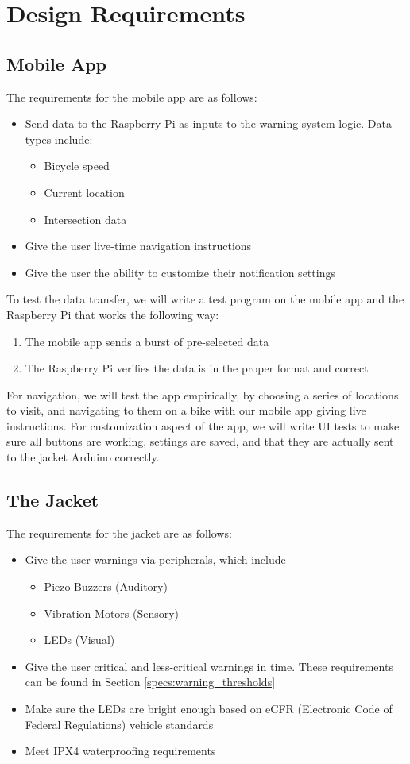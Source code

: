 \documentclass[journal]{IEEEtran}
\begin{document}
\section{Design Requirements}
\subsection{Mobile App}
The requirements for the mobile app are as follows:
\begin{itemize}
  \item Send data to the Raspberry Pi as inputs to the warning system logic. Data types include:
  \begin{itemize}
    \item Bicycle speed
    \item Current location
    \item Intersection data
  \end{itemize}
  \item Give the user live-time navigation instructions
  \item Give the user the ability to customize their notification settings
\end{itemize}
To test the data transfer, we will write a test program on the mobile app and the Raspberry Pi that works the following way:
\begin{enumerate}
    \item The mobile app sends a burst of pre-selected data
    \item The Raspberry Pi verifies the data is in the proper format and correct
\end{enumerate}
For navigation, we will test the app empirically, by choosing a series of locations to visit, and navigating to them on a bike with our mobile app giving live instructions.
For customization aspect of the app, we will write UI tests to make sure all buttons are working, settings are saved, and that they are actually sent to the jacket Arduino correctly. 
\subsection{The Jacket}
The requirements for the jacket are as follows:
\begin{itemize}
  \item Give the user warnings via peripherals, which include
  \begin{itemize}
    \item Piezo Buzzers (Auditory)
    \item Vibration Motors (Sensory)
    \item LEDs (Visual)
  \end{itemize}
  \item Give the user critical and less-critical warnings in time. These requirements can be found in Section \ref{specs:warning_thresholds}
  \item Make sure the LEDs are bright enough based on eCFR (Electronic Code of Federal Regulations) vehicle standards  \item Meet IPX4 waterproofing requirements
\end{itemize}
\end{document}
